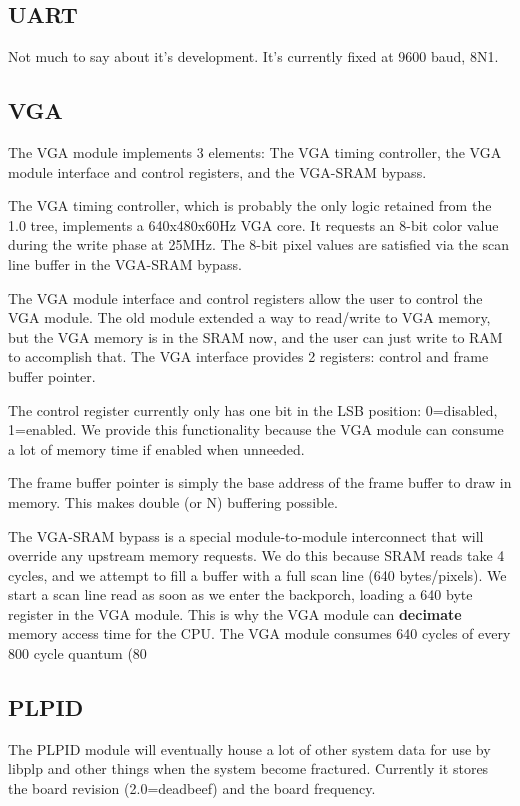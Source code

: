 \documentclass{article}
\begin{document}
\subsection{UART}
Not much to say about it's development. It's currently fixed at 9600 baud, 8N1.

\subsection{VGA}

The VGA module implements 3 elements: The VGA timing controller, the VGA module interface and control registers, and the VGA-SRAM bypass.

The VGA timing controller, which is probably the only logic retained from the 1.0 tree, implements a 640x480x60Hz VGA core. It requests an 8-bit color value during the write phase at 25MHz. The 8-bit pixel values are satisfied via the scan line buffer in the VGA-SRAM bypass.

The VGA module interface and control registers allow the user to control the VGA module. The old module extended a way to read/write to VGA memory, but the VGA memory is in the SRAM now, and the user can just write to RAM to accomplish that. The VGA interface provides 2 registers: control and frame buffer pointer.

The control register currently only has one bit in the LSB position: 0=disabled, 1=enabled. We provide this functionality because the VGA module can consume a lot of memory time if enabled when unneeded.

The frame buffer pointer is simply the base address of the frame buffer to draw in memory. This makes double (or N) buffering possible.

The VGA-SRAM bypass is a special module-to-module interconnect that will override any upstream memory requests. We do this because SRAM reads take 4 cycles, and we attempt to fill a buffer with a full scan line (640 bytes/pixels). We start a scan line read as soon as we enter the backporch, loading a 640 byte register in the VGA module. This is why the VGA module can \textbf{decimate} memory access time for the CPU. The VGA module consumes 640 cycles of every 800 cycle quantum (80%

\subsection{PLPID}

The PLPID module will eventually house a lot of other system data for use by libplp and other things when the system become fractured. Currently it stores the board revision (2.0=deadbeef) and the board frequency.
\end{document}

